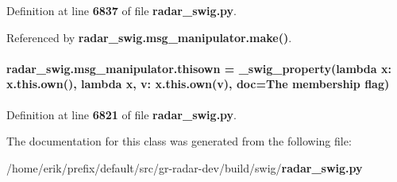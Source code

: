 Definition at line {\bf 6837} of file {\bf radar\+\_\+swig.\+py}.



Referenced by {\bf radar\+\_\+swig.\+msg\+\_\+manipulator.\+make()}.

\paragraph[{thisown}]{\setlength{\rightskip}{0pt plus 5cm}radar\+\_\+swig.\+msg\+\_\+manipulator.\+thisown = {\bf \+\_\+swig\+\_\+property}(lambda x\+: x.\+this.\+own(), lambda {\bf x}, v\+: x.\+this.\+own(v), doc=\textquotesingle{}The membership flag\textquotesingle{})\hspace{0.3cm}{\ttfamily [static]}}\label{classradar__swig_1_1msg__manipulator_a1b9f55bd0ecc0bc3ac5b68f1d49326d3}


Definition at line {\bf 6821} of file {\bf radar\+\_\+swig.\+py}.



The documentation for this class was generated from the following file\+:\begin{DoxyCompactItemize}
\item 
/home/erik/prefix/default/src/gr-\/radar-\/dev/build/swig/{\bf radar\+\_\+swig.\+py}\end{DoxyCompactItemize}
